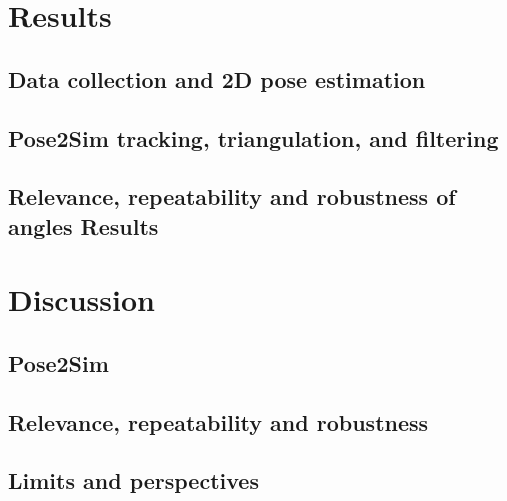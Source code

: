 \section{Results}
\subsection{Data collection and 2D pose estimation}
\blindtext

\subsection{Pose2Sim tracking, triangulation, and filtering}
\blindtext

\subsection{Relevance, repeatability and robustness of angles Results}
\blindtext


\section{Discussion}
\subsection{Pose2Sim}
\blindtext

\subsection{Relevance, repeatability and robustness}
\blindtext

\subsection{Limits and perspectives}
\blindtext
